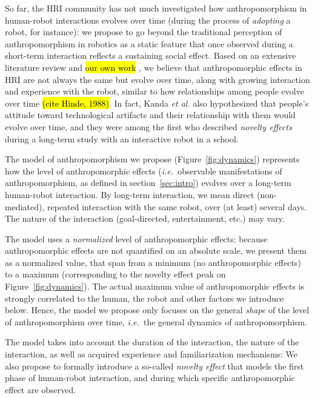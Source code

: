 \documentclass[lettersize, apacite, twoside, HRI]{apa_HRI}
\newcommand{\ie}{{\textit{i.e.~}}}
\begin{document}
So far, the HRI community has not much investigated how anthropomorphism in
human-robot interactions evolves over time (during the process of
\emph{adopting} a robot, for instance): we propose to go beyond the traditional
perception of anthropomorphism in robotics as a static feature that once
observed during a short-term interaction reflects a sustaining social effect.
Based on an extensive literature review \cite{fink_anthropomorphism_2012} and \hl{our own work} , we believe that anthropomorphic effects in HRI are not always the same but evolve over time, along with growing interaction
and experience with the robot, similar to how relationships among people evolve over time \hl{(cite Hinde, 1988)}. In fact, Kanda \textit{et al.} \cite{kanda_interactive_2004} also hypothesized that people's attitude toward technological artifacts and their relationship with them would evolve over time, and they were among the first who described \textit{novelty effects} during a long-term study with an interactive robot in a school.

The model of anthropomorphism we propose (Figure~\ref{fig:dynamics}) represents
how the level of anthropomorphic effects (\ie observable manifestations of
anthropomorphism, as defined in section~\ref{sec:intro}) evolves over a
long-term human-robot interaction. By long-term interaction, we mean direct
(non-mediated), repeated interaction with the same robot, over (at least) several
days. The nature of the interaction (goal-directed, entertainment, etc.) may vary.

The model uses a \emph{normalized} level of anthropomorphic effects: because
anthropomorphic effects are not quantified on an absolute scale, we present
them as a normalized value, that span from a minimum (no anthropomorphic
effects) to a maximum (corresponding to the novelty effect peak on
Figure~\ref{fig:dynamics}). The actual maximum value of anthropomorphic effects
is strongly correlated to the human, the robot and other factors we introduce
below. Hence, the model we propose only focuses on the general \emph{shape} of
the level of anthropomorphism over time, \ie the general dynamics of
anthropomorphism.

The model takes into account the duration of the interaction, the nature of the
interaction, as well as acquired experience and familiarization mechanisms: We
also propose to formally introduce a so-called \emph{novelty effect} that
models the first phase of human-robot interaction, and during which specific
anthropomorphic effect are observed.
\end{document}
